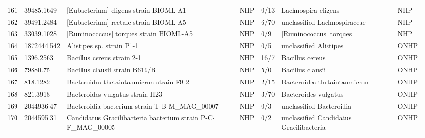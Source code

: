 \begin{longtable}{llllllll}
161 &    39485.1649 &                                    [Eubacterium] eligens strain BIOML-A1 &   NHP &      0/13 &                            Lachnospira eligens &                    \cite{poyet2019library,chung2017prebiotic} &   NHP \\
162 &    39491.2484 &                                    [Eubacterium] rectale strain BIOML-A5 &   NHP &      6/70 &                   unclassified Lachnospiraceae &            \cite{poyet2019library,rosero2016reclassification} &   NHP \\
163 &    33039.1028 &                                   [Ruminococcus] torques strain BIOML-A5 &   NHP &       0/9 &                         [Ruminococcus] torques &                   \cite{poyet2019library,togo2018description} &   NHP \\
164 &   1872444.542 &                                                Alistipes sp. strain P1-1 &   NHP &       0/5 &                         unclassified Alistipes &                                        \cite{parker2020genus} &  ONHP \\
165 &     1396.2563 &                                               Bacillus cereus strain 2-1 &   NHP &      16/7 &                                Bacillus cereus &                             \cite{zhu2016probiotic,1396.2563} &  ONHP \\
166 &      79880.75 &                                           Bacillus clausii strain B619/R &   NHP &       5/0 &                               Bacillus clausii &                                       \cite{princess2020good} &  ONHP \\
167 &      818.1282 &                                 Bacteroides thetaiotaomicron strain F9-2 &   NHP &      2/15 &                   Bacteroides thetaiotaomicron &                            \cite{thornton2012effect,818.1282} &  ONHP \\
168 &      821.3918 &                                          Bacteroides vulgatus strain H23 &   NHP &      3/70 &                           Bacteroides vulgatus &                                            \cite{cuyv2017gut} &  ONHP \\
169 &    2044936.47 &                           Bacteroidia bacterium strain T-B-M\_MAG\_00007 &   NHP &       0/3 &                       unclassified Bacteroidia &                                         \cite{perez2014newly} &  ONHP \\
170 &    2044595.31 &            Candidatus Gracilibacteria bacterium strain P-C-F\_MAG\_00005 &   NHP &       0/2 &        unclassified Candidatus Gracilibacteria &                                  \cite{nibali2020differences} &  ONHP \\

\end{longtable}

